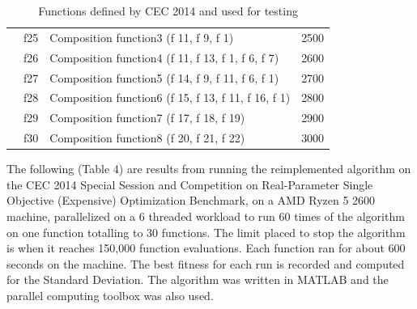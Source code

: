 \begin{table}[]
\begin{tabular}{llll}
    & f25 & Composition function3 (f 11, f 9, f 1) & 2500 \\
    & f26 & Composition function4 (f 11, f 13, f 1, f 6, f 7) & 2600 \\
    & f27 & Composition function5 (f 14, f 9, f 11, f 6, f 1) & 2700 \\
    & f28 & Composition function6 (f 15, f 13, f 11, f 16, f 1) & 2800 \\
    & f29 & Composition function7 (f 17, f 18, f 19) & 2900 \\
    & f30 & Composition function8 (f 20, f 21, f 22) & 3000
\end{tabular}
\caption{Functions defined by CEC 2014 and used for testing}
\end{table}

\clearpage

The following (Table 4) are results from running the reimplemented algorithm on the CEC 2014 Special Session and Competition on Real-Parameter Single Objective (Expensive) Optimization Benchmark\cite{liang_2013}, on a AMD Ryzen 5 2600 machine, parallelized on a 6 threaded workload to run 60 times of the algorithm on one function totalling to 30 functions. The limit placed to stop the algorithm is when it reaches 150,000 function evaluations. Each function ran for about 600 seconds on the machine. The best fitness for each run is recorded and computed for the Standard Deviation. The algorithm was written in MATLAB and the parallel computing toolbox was also used.


